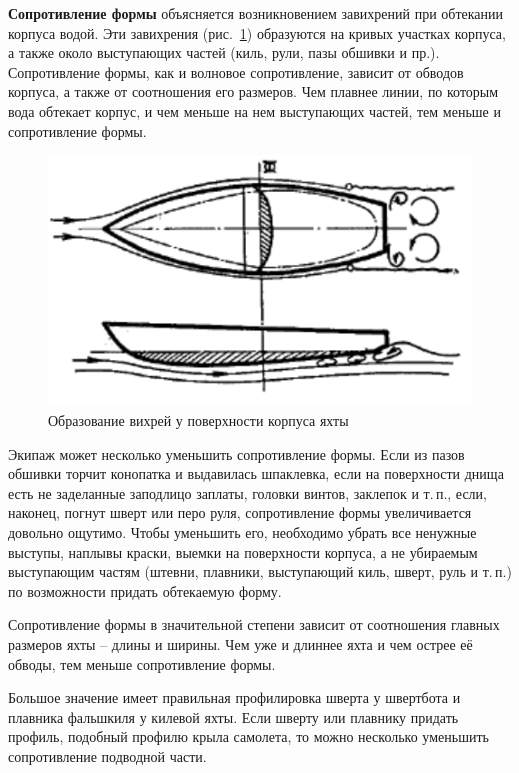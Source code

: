 \documentclass[a4paper, 12pt, twoside, final]{scrbook}
\begin{document}
\textbf{Сопротивление формы} объясняется возникновением завихрений при обтекании корпуса водой. Эти завихрения (рис.~\ref{fig:84}) образуются на кривых участках корпуса, а также около выступающих частей (киль, рули, пазы обшивки и пр.). Сопротивление формы, как и волновое сопротивление, зависит от обводов корпуса, а также от соотношения его размеров. Чем плавнее линии, по которым вода обтекает корпус, и чем меньше на нем выступающих частей, тем меньше и сопротивление формы.

\begin{figure}
   \centering
   \includegraphics{84_Obrazovanie_vihrej} %
   \caption{Образование вихрей у поверхности корпуса яхты}
   \label{fig:84}
\end{figure}

Экипаж может несколько уменьшить сопротивление формы. Если из пазов обшивки торчит конопатка и выдавилась шпаклевка, если на поверхности днища есть не заделанные заподлицо заплаты, головки винтов, заклепок и т.\,п., если, наконец, погнут шверт или перо руля, сопротивление формы увеличивается довольно ощутимо. Чтобы уменьшить его, необходимо убрать все ненужные выступы, наплывы краски, выемки на поверхности корпуса, а не убираемым выступающим частям (штевни, плавники, выступающий киль, шверт, руль и т.\,п.) по возможности придать обтекаемую форму.

Сопротивление формы в значительной степени зависит от соотношения главных размеров яхты \--- длины и ширины. Чем уже и длиннее яхта и чем острее её обводы, тем меньше сопротивление формы.

Большое значение имеет правильная профилировка шверта у швертбота и плавника фальшкиля у килевой яхты. Если шверту или плавнику придать профиль, подобный профилю крыла самолета, то можно несколько уменьшить сопротивление подводной части.{\sloppy\par}
\end{document}

